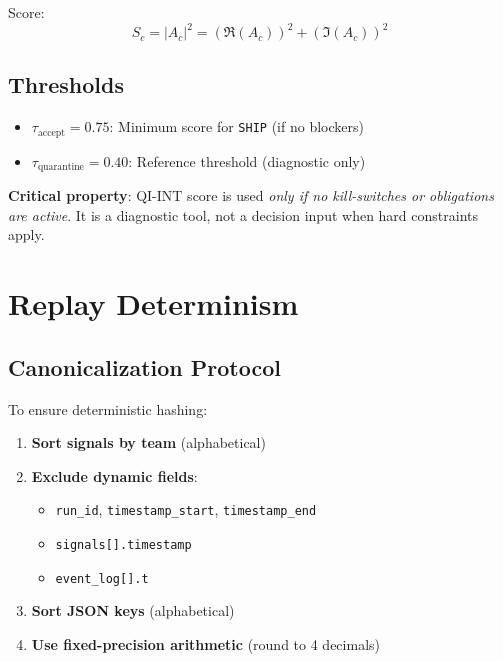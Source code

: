 \documentclass[11pt, letterpaper]{article}
\begin{document}
Score:
\[
S_c = |A_c|^2 = (\Re(A_c))^2 + (\Im(A_c))^2
\]

\subsection{Thresholds}

\begin{itemize}
    \item $\tau_{\text{accept}} = 0.75$: Minimum score for \texttt{SHIP} (if no blockers)
    \item $\tau_{\text{quarantine}} = 0.40$: Reference threshold (diagnostic only)
\end{itemize}

\textbf{Critical property}: QI-INT score is used \textit{only if no kill-switches or obligations are active}. It is a diagnostic tool, not a decision input when hard constraints apply.

\section{Replay Determinism}

\subsection{Canonicalization Protocol}

To ensure deterministic hashing:

\begin{enumerate}
    \item \textbf{Sort signals by team} (alphabetical)
    \item \textbf{Exclude dynamic fields}:
    \begin{itemize}
        \item \texttt{run\_id}, \texttt{timestamp\_start}, \texttt{timestamp\_end}
        \item \texttt{signals[].timestamp}
        \item \texttt{event\_log[].t}
    \end{itemize}
    \item \textbf{Sort JSON keys} (alphabetical)
    \item \textbf{Use fixed-precision arithmetic} (round to 4 decimals)
\end{enumerate}
\end{document}
